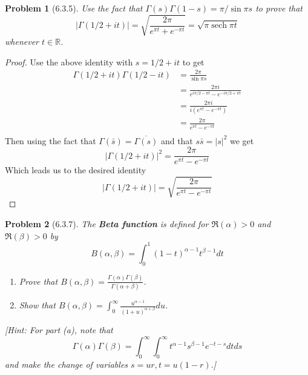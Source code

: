\documentclass[10pt]{article}
\newcommand{\sk}{\vskip 10mm}
\newcommand{\bb}[1]{\mathbb{#1}}
\DeclareMathOperator{\sech}{sech}
\theoremstyle{plain}
\newtheorem{problem}{Problem}
\theoremstyle{remark}
\begin{document}
\sk

\begin{problem}[6.3.5]
  Use the fact that $\Gamma(s)\Gamma(1-s)=\pi/\sin\pi s$ to prove that
  \[
    |\Gamma(1/2+it)|=\sqrt{\frac{2\pi}{e^{\pi t}+e^{-\pi t}}}=\sqrt{\pi\sech{\pi t}}
  \]
  whenever $t\in \bb{R}$.
\end{problem}

\begin{proof}
  Use the above identity with $s=1/2+it$ to get
  \begin{align*}
    \Gamma(1/2+it)\Gamma(1/2-it) &= \frac{2\pi}{\sin\pi s}\\
                       &= \frac{2\pi i}{e^{i\pi/2-\pi t}-e^{-i\pi/2+\pi t}}\\
                       &= \frac{2\pi i}{i(e^{\pi t}-e^{-\pi t})}\\
                       &= \frac{2\pi}{e^{\pi t}-e^{-\pi t}}\\
  \end{align*}
  Then using the fact that $\Gamma(\bar{s})=\overline{\Gamma(s)}$ and
  that $s\bar{s}=|s|^2$ we get
  \[
    |\Gamma(1/2+it)|^2=\frac{2\pi}{e^{\pi t}-e^{-\pi t}}
  \]
  Which leads us to the desired identity
  \[
    |\Gamma(1/2+it)|=\sqrt{\frac{2\pi}{e^{\pi t}-e^{-\pi t}}}
  \]
\end{proof}

\sk

\begin{problem}[6.3.7]
  The \textbf{Beta function} is defined for $\Re(\alpha)>0$ and
  $\Re(\beta)>0$ by
  \[
    B(\alpha,\beta)=\int_0^1(1-t)^{\alpha-1}t^{\beta-1}dt
  \]
  \begin{enumerate}
  \item[(a)] Prove that
    $B(\alpha,\beta)=\frac{\Gamma(\alpha)\Gamma(\beta)}{\Gamma(\alpha+\beta)}$.
  \item[(b)] Show that
    $B(\alpha,\beta)=\int_0^\infty\frac{u^{\alpha-1}}{(1+u)^{\alpha+\beta}}du$.
  \end{enumerate}
  [Hint: For part (a), note that
  \[
    \Gamma(\alpha)\Gamma(\beta)=\int_0^\infty\int_0^\infty t^{\alpha-1}s^{\beta-1}e^{-t-s}dtds
  \]
  and make the change of variables $s=ur,t=u(1-r)$.]
\end{problem}
\end{document}
